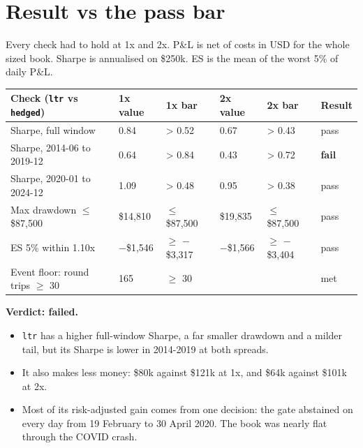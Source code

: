 \documentclass{article}
\begin{document}
\section{Result vs the pass bar}

Every check had to hold at 1x and 2x. P\&L is net of costs in USD for the whole sized book. Sharpe is annualised on \$250k. ES is the mean of the worst 5\% of daily P\&L.

\begin{center}\small
\begin{tabularx}{\linewidth}{>{\raggedright\arraybackslash}X l l l l l}
\toprule
\textbf{Check (\texttt{ltr} vs \texttt{hedged})} & \textbf{1x value} & \textbf{1x bar} & \textbf{2x value} & \textbf{2x bar} & \textbf{Result} \\
\midrule
Sharpe, full window & 0.84 & > 0.52 & 0.67 & > 0.43 & pass \\
Sharpe, 2014-06 to 2019-12 & 0.64 & > 0.84 & 0.43 & > 0.72 & \textbf{fail} \\
Sharpe, 2020-01 to 2024-12 & 1.09 & > 0.48 & 0.95 & > 0.38 & pass \\
Max drawdown \ensuremath{\leq} \$87,500 & \$14,810 & \ensuremath{\leq} \$87,500 & \$19,835 & \ensuremath{\leq} \$87,500 & pass \\
ES 5\% within 1.10x & \ensuremath{-}\$1,546 & \ensuremath{\geq} \ensuremath{-}\$3,317 & \ensuremath{-}\$1,566 & \ensuremath{\geq} \ensuremath{-}\$3,404 & pass \\
Event floor: round trips \ensuremath{\geq} 30 & 165 & \ensuremath{\geq} 30 &  &  & met \\
\bottomrule
\end{tabularx}
\end{center}

\textbf{Verdict: failed.}

\begin{itemize}

\item \texttt{ltr} has a higher full-window Sharpe, a far smaller drawdown and a milder tail, but its Sharpe is lower in 2014-2019 at both spreads.

\item It also makes less money: \$80k against \$121k at 1x, and \$64k against \$101k at 2x.

\item Most of its risk-adjusted gain comes from one decision: the gate abstained on every day from 19 February to 30 April 2020. The book was nearly flat through the COVID crash.

\end{itemize}
\end{document}
